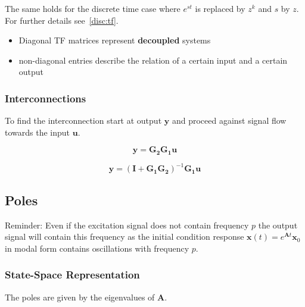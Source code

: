 
The same holds for the discrete time case where $e^{st}$ is replaced by $z^k$ and $s$ by $z$. For further details see~\ref{disc:tf}.

\newpar{}
\begin{itemize}
    \item Diagonal TF matrices represent \textbf{decoupled} systems
    \item non-diagonal entries describe the relation of a certain input and a certain output
\end{itemize}

\subsubsection{Interconnections}

To find the interconnection start at output $\mathbf{y}$ and proceed against signal flow towards the input $\mathbf{u}$.

\newpar{}
\newpar{}
\begin{center}
    
\end{center}

\begin{equation*}
    \mathbf{y}=\mathbf{G_2G_1u}
\end{equation*}

\newpar{}
\newpar{}
\begin{center}
    
\end{center}

\begin{equation*}
    \mathbf{y}={(\mathbf{I}+\mathbf{G_1G_2})}^{-1}\mathbf{G_1u}
\end{equation*}


\subsection{Poles}
Reminder: Even if the excitation signal does not contain frequency $p$ the output signal will contain this frequency as the initial condition response $\mathbf{x}(t) = e^{\mathbf{A}t}\mathbf{x}_0$ in modal form contains oscillations with frequency $p$.

\subsubsection{State-Space Representation}
The poles are given by the eigenvalues of $\mathbf{A}$.

